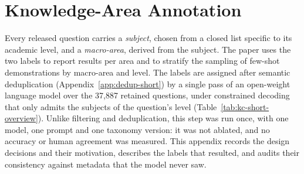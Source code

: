 %
%
\providecommand{\KnowledgeFigDir}{figures}

\section{Knowledge-Area Annotation}
\label{app:kc-short}

Every released question carries a \emph{subject}, chosen from a closed list
specific to its academic level, and a \emph{macro-area}, derived from the
subject. The paper uses the two labels to report results per area and to
stratify the sampling of few-shot demonstrations by macro-area and level.
The labels are assigned after semantic deduplication
(Appendix~\ref{app:dedup-short}) by a single pass of an open-weight language
model over the 37,887 retained questions, under constrained decoding that
only admits the subjects of the question's level
(Table~\ref{tab:kc-short-overview}). Unlike filtering and deduplication, this
step was run once, with one model, one prompt and one taxonomy version: it
was not ablated, and no accuracy or human agreement was measured. This
appendix records the design decisions and their motivation, describes the
labels that resulted, and audits their consistency against metadata that the
model never saw.

